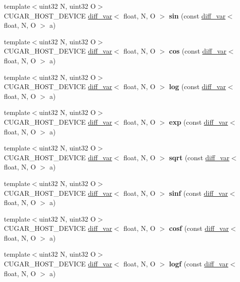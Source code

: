 \begin{DoxyCompactItemize}
\item 
{\footnotesize template$<$uint32 N, uint32 O$>$ }\\C\+U\+G\+A\+R\+\_\+\+H\+O\+S\+T\+\_\+\+D\+E\+V\+I\+CE \hyperlink{structcugar_1_1diff__var}{diff\+\_\+var}$<$ float, N, O $>$ {\bfseries sin} (const \hyperlink{structcugar_1_1diff__var}{diff\+\_\+var}$<$ float, N, O $>$ a)
\item 
{\footnotesize template$<$uint32 N, uint32 O$>$ }\\C\+U\+G\+A\+R\+\_\+\+H\+O\+S\+T\+\_\+\+D\+E\+V\+I\+CE \hyperlink{structcugar_1_1diff__var}{diff\+\_\+var}$<$ float, N, O $>$ {\bfseries cos} (const \hyperlink{structcugar_1_1diff__var}{diff\+\_\+var}$<$ float, N, O $>$ a)
\item 
{\footnotesize template$<$uint32 N, uint32 O$>$ }\\C\+U\+G\+A\+R\+\_\+\+H\+O\+S\+T\+\_\+\+D\+E\+V\+I\+CE \hyperlink{structcugar_1_1diff__var}{diff\+\_\+var}$<$ float, N, O $>$ {\bfseries log} (const \hyperlink{structcugar_1_1diff__var}{diff\+\_\+var}$<$ float, N, O $>$ a)
\item 
{\footnotesize template$<$uint32 N, uint32 O$>$ }\\C\+U\+G\+A\+R\+\_\+\+H\+O\+S\+T\+\_\+\+D\+E\+V\+I\+CE \hyperlink{structcugar_1_1diff__var}{diff\+\_\+var}$<$ float, N, O $>$ {\bfseries exp} (const \hyperlink{structcugar_1_1diff__var}{diff\+\_\+var}$<$ float, N, O $>$ a)
\item 
{\footnotesize template$<$uint32 N, uint32 O$>$ }\\C\+U\+G\+A\+R\+\_\+\+H\+O\+S\+T\+\_\+\+D\+E\+V\+I\+CE \hyperlink{structcugar_1_1diff__var}{diff\+\_\+var}$<$ float, N, O $>$ {\bfseries sqrt} (const \hyperlink{structcugar_1_1diff__var}{diff\+\_\+var}$<$ float, N, O $>$ a)
\item 
{\footnotesize template$<$uint32 N, uint32 O$>$ }\\C\+U\+G\+A\+R\+\_\+\+H\+O\+S\+T\+\_\+\+D\+E\+V\+I\+CE \hyperlink{structcugar_1_1diff__var}{diff\+\_\+var}$<$ float, N, O $>$ {\bfseries sinf} (const \hyperlink{structcugar_1_1diff__var}{diff\+\_\+var}$<$ float, N, O $>$ a)
\item 
{\footnotesize template$<$uint32 N, uint32 O$>$ }\\C\+U\+G\+A\+R\+\_\+\+H\+O\+S\+T\+\_\+\+D\+E\+V\+I\+CE \hyperlink{structcugar_1_1diff__var}{diff\+\_\+var}$<$ float, N, O $>$ {\bfseries cosf} (const \hyperlink{structcugar_1_1diff__var}{diff\+\_\+var}$<$ float, N, O $>$ a)
\item 
{\footnotesize template$<$uint32 N, uint32 O$>$ }\\C\+U\+G\+A\+R\+\_\+\+H\+O\+S\+T\+\_\+\+D\+E\+V\+I\+CE \hyperlink{structcugar_1_1diff__var}{diff\+\_\+var}$<$ float, N, O $>$ {\bfseries logf} (const \hyperlink{structcugar_1_1diff__var}{diff\+\_\+var}$<$ float, N, O $>$ a)

\end{DoxyCompactItemize}
